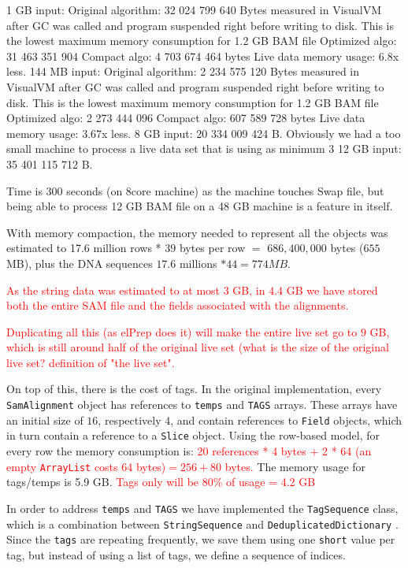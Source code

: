 \documentclass[a4paper,twoside]{article}
\begin{document}
1 GB input:
Original algorithm: 32 024 799 640 Bytes measured in VisualVM after GC was called and program suspended right before writing to disk.
This is the lowest maximum memory consumption for 1.2 GB BAM file
Optimized algo: 31 463 351 904
Compact algo: 4 703 674 464 bytes	
Live data memory usage: 6.8x less.
144 MB input:
Original algorithm: 2 234 575 120 Bytes measured in VisualVM after GC was called and program suspended right before writing to disk.
This is the lowest maximum memory consumption for 1.2 GB BAM file
Optimized algo: 2 273 444 096
Compact algo: 607 589 728 bytes	
Live data memory usage: 3.67x less.
8 GB input: 20 334 009 424 B\@.
Obviously we had a too small machine to process a live data set that is using as minimum 3
12 GB input: 35 401 115 712 B\@.

Time is 300 seconds (on 8core machine) as the machine touches Swap file, but being able to process 12 GB BAM file on a 48 GB machine is a feature in itself.


With memory compaction, the memory needed to represent all the objects was estimated to 17.6 million rows * $39$ bytes per row $=$ $686,400,000$ bytes ($655$ MB), plus the DNA sequences  $17.6$ millions $* 44 = 774 MB$.

\textcolor{red}{
As the string data was estimated to at most $3$ GB, in $4.4$ GB we have stored both the entire SAM file and the fields associated with the alignments.
}

\textcolor{red}{
Duplicating all this (as elPrep does it) will make the entire live set go to $9$ GB, which is still around half of the original live set (what is the size of the original live set?
definition of "the live set".
}

On top of this, there is the cost of tags.
In the original implementation, every {\texttt{SamAlignment} } object has references to {\texttt{temps} } and {\texttt{TAGS} } arrays.
These arrays have an initial size of $16$, respectively $4$, and contain references to {\texttt{Field} } objects, which in turn contain a reference to a {\texttt{Slice} } object.
Using the row-based model, for every row the memory consumption is:
\textcolor{red}{20 references * 4 bytes + 2 * 64 (an empty {\texttt{ArrayList} } costs 64 bytes)$= 256 + 80$ bytes.}
The memory usage for tags/temps is 5.9 GB\@.
\textcolor{red}{Tags only will be 80\% of usage = 4.2 GB}

In order to address {\texttt{temps} } and {\texttt{TAGS} } we have implemented the {\texttt{TagSequence} } class, which is a combination between {\texttt{StringSequence} } and {\texttt{DeduplicatedDictionary} }.
Since the {\texttt{tags} } are repeating frequently, we save them using one {\texttt{short} } value per tag, but instead of using a list of tags, we define a sequence of indices.
\end{document}
